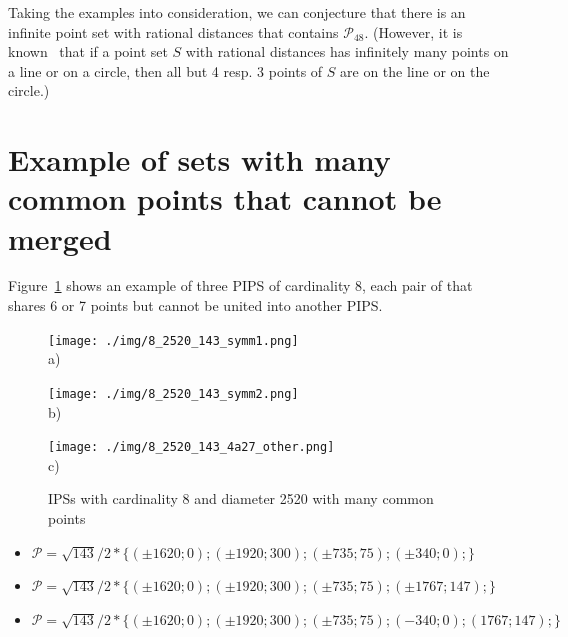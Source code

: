 \documentclass[12pt]{article}
\theoremstyle{theorem}
\theoremstyle{dfn}
\theoremstyle{remark}
\begin{document}
Taking the examples into consideration,
we can conjecture that there is an infinite point set with rational distances
that contains $\mathcal{P}_{48}$.
(However, it is known~\cite{solymosi2010question} that
if a point set $S$ with rational distances has infinitely many points on a line or on a circle,
then all but 4 resp. 3 points of $S$ are on the line or on the circle.)


\section{Example of sets with many common points that cannot be merged}

Figure~\ref{8_with_many_common} shows an example of three PIPS of cardinality 8,
each pair of that shares 6 or 7 points but cannot be united into another PIPS.

\begin{figure}[h!]
	\begin{minipage}[h]{0.32\linewidth}
		\begin{center}
			\texttt{[image: ./img/8\_2520\_143\_symm1.png]}\\ a)
		\end{center}
	\end{minipage}
	\hfill
	\begin{minipage}[h]{0.32\linewidth}
		\begin{center}
			\texttt{[image: ./img/8\_2520\_143\_symm2.png]}\\ b)
		\end{center}
	\end{minipage}
	\begin{minipage}[h]{0.32\linewidth}
		\begin{center}
			\texttt{[image: ./img/8\_2520\_143\_4a27\_other.png]}\\ c)
		\end{center}
	\end{minipage}
	\hfill
	\caption{IPSs with cardinality 8 and diameter 2520 with many common points}
	\label{8_with_many_common}
\end{figure}

\begin{itemize}
\item
$\mathcal{P}=\sqrt{143}/2*\{
( \pm1620 ; 0);
( \pm1920 ; 300);
( \pm735 ; 75);
( \pm340 ; 0);
\}$

\item
$\mathcal{P}=\sqrt{143}/2*\{
( \pm1620 ; 0);
( \pm1920 ; 300);
( \pm735 ; 75);
( \pm1767 ; 147);
\}$

\item
$\mathcal{P}=
\sqrt{143}/2*\{
( \pm1620 ; 0);
( \pm1920 ; 300);
( \pm735 ; 75);
( -340 ; 0);
( 1767 ; 147);
\}$

\end{itemize}
\end{document}
